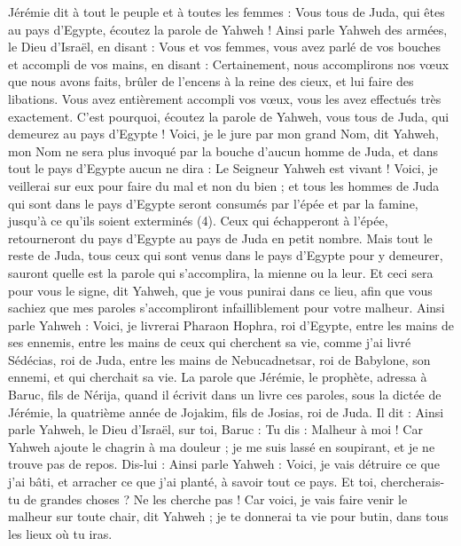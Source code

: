 \begin{multicols}{2}
Jérémie dit à tout le peuple et à toutes les femmes : Vous tous de Juda, qui êtes au pays d'Egypte, écoutez la parole de Yahweh !
Ainsi parle Yahweh des armées, le Dieu d'Israël, en disant : Vous et vos femmes, vous avez parlé de vos bouches et accompli de vos mains, en disant : Certainement, nous accomplirons nos vœux que nous avons faits, brûler de l’encens à la reine des cieux, et lui faire des libations. Vous avez entièrement accompli vos vœux, vous les avez effectués très exactement.
C'est pourquoi, écoutez la parole de Yahweh, vous tous de Juda, qui demeurez au pays d'Egypte ! Voici, je le jure par mon grand Nom, dit Yahweh, mon Nom ne sera plus invoqué par la bouche d'aucun homme de Juda, et dans tout le pays d'Egypte aucun ne dira : Le Seigneur Yahweh est vivant !
Voici, je veillerai sur eux pour faire du mal et non du bien ; et tous les hommes de Juda qui sont dans le pays d'Egypte seront consumés par l'épée et par la famine, jusqu’à ce qu'ils soient exterminés\FTNT{} (4).
Ceux qui échapperont à l'épée, retourneront du pays d'Egypte au pays de Juda en petit nombre. Mais tout le reste de Juda, tous ceux qui sont venus dans le pays d'Egypte pour y demeurer, sauront quelle est la parole qui s'accomplira, la mienne ou la leur.
Et ceci sera pour vous le signe, dit Yahweh, que je vous punirai dans ce lieu, afin que vous sachiez que mes paroles s’accompliront infailliblement pour votre malheur.
Ainsi parle Yahweh : Voici, je livrerai Pharaon Hophra, roi d'Egypte, entre les mains de ses ennemis, entre les mains de ceux qui cherchent sa vie, comme j'ai livré Sédécias, roi de Juda, entre les mains de Nebucadnetsar, roi de Babylone, son ennemi, et qui cherchait sa vie.
\VerseOne{}La parole que Jérémie, le prophète, adressa à  Baruc, fils de Nérija, quand il écrivit dans un livre ces paroles, sous la dictée de Jérémie, la quatrième année de Jojakim, fils de Josias, roi de Juda. Il dit :
Ainsi parle Yahweh, le Dieu d'Israël, sur toi, Baruc :
Tu dis : Malheur à moi ! Car Yahweh ajoute le chagrin à ma douleur ; je me suis lassé en soupirant, et je ne trouve pas de repos.
Dis-lui : Ainsi parle Yahweh : Voici, je vais détruire ce que j'ai bâti, et arracher ce que j'ai planté, à savoir tout ce pays.
Et toi, chercherais-tu de grandes choses ? Ne les cherche pas ! Car voici, je vais faire venir le malheur sur toute chair, dit Yahweh ; je te donnerai ta vie pour butin, dans tous les lieux où tu iras.

\end{multicols}
